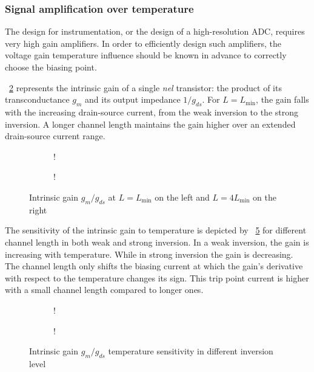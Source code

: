\subsubsection{Signal amplification over temperature}
\label{sec:des_accuracy}
The design for instrumentation, or the design of a high-resolution ADC, requires very high gain amplifiers. In order to efficiently design such amplifiers, the voltage gain temperature influence should be known in advance to correctly choose the biasing point.

\figurename~\ref{fig:Av_nel} represents the intrinsic gain of a single \emph{nel} transistor: the product of its transconductance \(g_m \) and its output impedance \(1/g_{ds} \). For \(L = L_{\min} \), the gain falls with the increasing drain-source current, from the weak inversion to the strong inversion. A longer channel length maintains the gain higher over an extended drain-source current range.
\begin{figure}[!ht]
	\centering
	\begin{subfigure}[b]{0.48\textwidth}
		\resizebox {\textwidth} {!} { 
			
		}
	\end{subfigure}
	\begin{subfigure}[b]{0.48\textwidth}
		\resizebox {\textwidth} {!} { 
			
		}
		\label{fig:Av_nel_sensitivity}
	\end{subfigure}
	\caption{Intrinsic gain \(g_m/g_{ds} \) at \(L = L_{\min}\) on the left and \(L = 4 L_{\min}\) on the right}
	\label{fig:Av_nel}
\end{figure}

The sensitivity of the intrinsic gain to temperature is depicted by \figurename~\ref{fig:sAv_nel} for different channel length in both weak and strong inversion. In a weak inversion, the gain is increasing with temperature. While in strong inversion the gain is decreasing. The channel length only shifts the biasing current at which the gain's derivative with respect to the temperature changes its sign. This trip point current is higher with a small channel length compared to longer ones.
\begin{figure}[!ht]
	\centering
	\begin{subfigure}[b]{0.48\textwidth}
		\resizebox {\textwidth} {!} { 
			
		}
		\label{fig:Av_nel_sensitivity_wi}
	\end{subfigure}
	\begin{subfigure}[b]{0.48\textwidth}
		\resizebox {\textwidth} {!} { 
			
		}
		\label{fig:Av_nel_sensitivity_si}
	\end{subfigure}
	\caption{Intrinsic gain \(g_m/g_{ds} \) temperature sensitivity in different inversion level}
	\label{fig:sAv_nel}
\end{figure}

